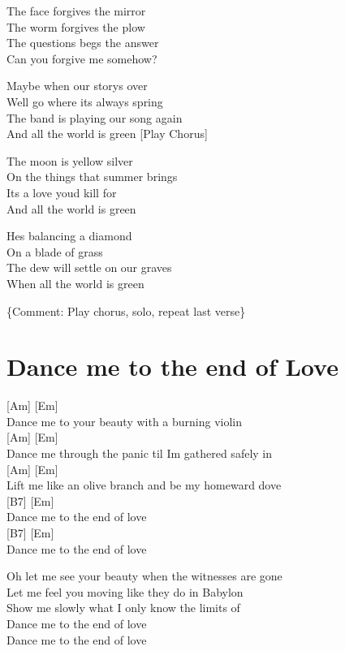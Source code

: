 \documentclass[
  letterpaper,
]{scrbook}
\begin{document}
The face forgives the mirror\\
The worm forgives the plow\\
The questions begs the answer\\
Can you forgive me somehow?

Maybe when our story\textquotesingle s over\\
We\textquotesingle ll go where it\textquotesingle s always spring\\
The band is playing our song again\\
And all the world is green {[}Play Chorus{]}

The moon is yellow silver\\
On the things that summer brings\\
It\textquotesingle s a love you\textquotesingle d kill for\\
And all the world is green

He\textquotesingle s balancing a diamond\\
On a blade of grass\\
The dew will settle on our graves\\
When all the world is green

\{Comment: Play chorus, solo, repeat last verse\}

\hypertarget{dance-me-to-the-end-of-love}{%
\chapter{Dance me to the end of
Love}\label{dance-me-to-the-end-of-love}}

{[}Am{]} {[}Em{]}\\
Dance me to your beauty with a burning violin\\
{[}Am{]} {[}Em{]}\\
Dance me through the panic \textquotesingle til I\textquotesingle m
gathered safely in\\
{[}Am{]} {[}Em{]}\\
Lift me like an olive branch and be my homeward dove\\
{[}B7{]} {[}Em{]}\\
Dance me to the end of love\\
{[}B7{]} {[}Em{]}\\
Dance me to the end of love

Oh let me see your beauty when the witnesses are gone\\
Let me feel you moving like they do in Babylon\\
Show me slowly what I only know the limits of\\
Dance me to the end of love\\
Dance me to the end of love
\end{document}
